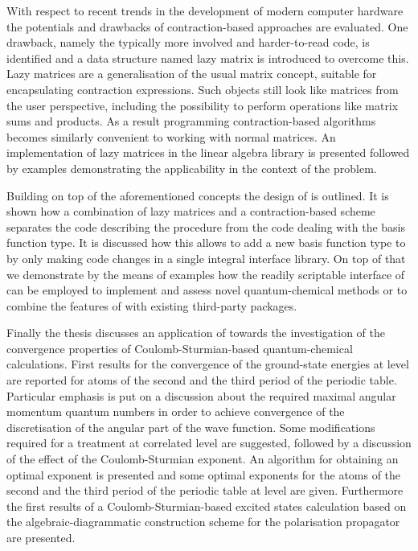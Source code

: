 With respect to recent trends in the development of modern computer hardware
the potentials and drawbacks of contraction-based approaches are evaluated.
One drawback, namely the typically more involved and harder-to-read code,
is identified and a data structure named lazy matrix is introduced
to overcome this.
Lazy matrices are a generalisation of the usual matrix concept,
suitable for encapsulating contraction expressions.
Such objects still look like matrices from the user perspective,
including the possibility to perform operations like matrix sums and products.
As a result programming contraction-based algorithms
becomes similarly convenient to working with normal matrices.
An implementation of lazy matrices in the \lazyten linear algebra library
is presented followed by examples
demonstrating the applicability in the context of the \HF problem.

Building on top of the aforementioned concepts the design of \molsturm is outlined.
It is shown how a combination of lazy matrices and a contraction-based \SCF scheme
separates the code describing the \SCF procedure
from the code dealing with the basis function type.
It is discussed how this allows to add a new basis function type
to \molsturm by only making code changes in a single integral interface library.
On top of that we demonstrate by the means of examples
how the readily scriptable interface of \molsturm
can be employed to implement and assess novel quantum-chemical methods
or to combine the features of \molsturm with existing third-party packages.

Finally the thesis discusses an application of \molsturm
towards the investigation of the convergence properties
of Coulomb-Sturmian-based quantum-chemical calculations.
First results for the convergence
of the ground-state energies at \HF level
are reported for atoms of the second and the third period
of the periodic table.
Particular emphasis is put on a discussion about the required
maximal angular momentum quantum numbers
in order to achieve convergence
of the discretisation of the angular part of the wave function.
Some modifications required for a treatment at correlated level are suggested,
followed by a discussion of the effect of the Coulomb-Sturmian exponent.
An algorithm for obtaining an optimal exponent is presented
and some optimal exponents for the atoms of the
second and the third period of the periodic table at \HF level are given.
Furthermore the first results of a Coulomb-Sturmian-based excited
states calculation based on the algebraic-diagrammatic construction
scheme for the polarisation propagator are presented.



